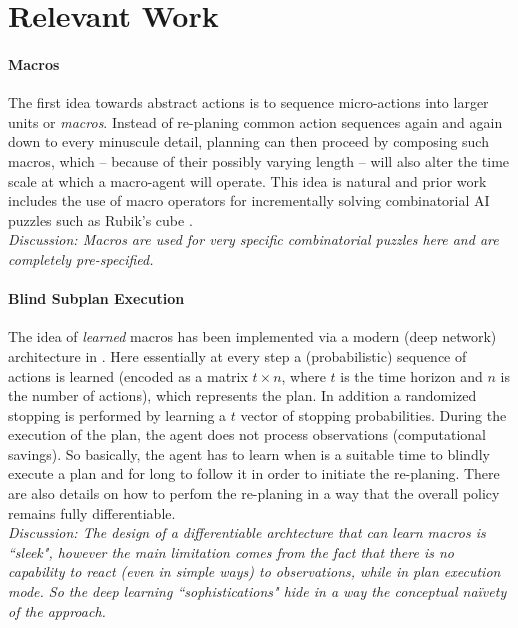 \documentclass{article}
\begin{document}
\section{Relevant Work}

\paragraph{Macros \cite{korf1983learning}} The first idea towards abstract actions is to sequence micro-actions into larger units or \textit{macros}. Instead of re-planing common action sequences again and again down to every minuscule detail, planning can then proceed by composing such macros, which -- because of their possibly varying length -- will also alter the time scale at which a macro-agent will operate. This idea is natural and prior work includes the use of macro operators for incrementally solving combinatorial AI puzzles such as Rubik's cube \cite{korf1983learning}. \\[2mm]
\textit{Discussion: Macros are used for very specific combinatorial puzzles here and are completely pre-specified.}

\paragraph{Blind Subplan Execution \cite{vezhnevets2016strategic}} The idea of \textit{learned} macros has been implemented via a modern (deep network) architecture in \cite{vezhnevets2016strategic}. Here essentially at every step a (probabilistic) sequence of actions is learned (encoded as a matrix $t \times n$, where $t$ is the time horizon and $n$ is the number of actions), which represents the plan. In addition a randomized stopping is performed by learning a $t$ vector of stopping probabilities. During the execution of the plan, the agent does not process observations (computational savings). So basically, the agent has to learn when is a suitable time to blindly execute a plan and for long to follow it in order to initiate the re-planing. There are also details on how to perfom the re-planing in a way that the overall policy remains fully differentiable. \\[2mm]
%
\textit{Discussion: The design of a differentiable archtecture that can learn macros is ``sleek", however the main limitation comes from the fact that there is no capability to react (even in simple ways) to observations, while in plan execution mode. So the deep learning ``sophistications" hide in a way the conceptual na\"ivety of the approach. } 
\end{document}
